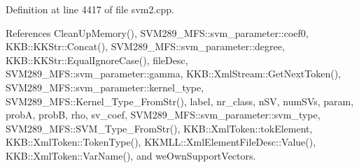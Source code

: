 Definition at line 4417 of file svm2.\+cpp.



References Clean\+Up\+Memory(), S\+V\+M289\+\_\+\+M\+F\+S\+::svm\+\_\+parameter\+::coef0, K\+K\+B\+::\+K\+K\+Str\+::\+Concat(), S\+V\+M289\+\_\+\+M\+F\+S\+::svm\+\_\+parameter\+::degree, K\+K\+B\+::\+K\+K\+Str\+::\+Equal\+Ignore\+Case(), file\+Desc, S\+V\+M289\+\_\+\+M\+F\+S\+::svm\+\_\+parameter\+::gamma, K\+K\+B\+::\+Xml\+Stream\+::\+Get\+Next\+Token(), S\+V\+M289\+\_\+\+M\+F\+S\+::svm\+\_\+parameter\+::kernel\+\_\+type, S\+V\+M289\+\_\+\+M\+F\+S\+::\+Kernel\+\_\+\+Type\+\_\+\+From\+Str(), label, nr\+\_\+class, n\+SV, num\+S\+Vs, param, probA, probB, rho, sv\+\_\+coef, S\+V\+M289\+\_\+\+M\+F\+S\+::svm\+\_\+parameter\+::svm\+\_\+type, S\+V\+M289\+\_\+\+M\+F\+S\+::\+S\+V\+M\+\_\+\+Type\+\_\+\+From\+Str(), K\+K\+B\+::\+Xml\+Token\+::tok\+Element, K\+K\+B\+::\+Xml\+Token\+::\+Token\+Type(), K\+K\+M\+L\+L\+::\+Xml\+Element\+File\+Desc\+::\+Value(), K\+K\+B\+::\+Xml\+Token\+::\+Var\+Name(), and we\+Own\+Support\+Vectors.


